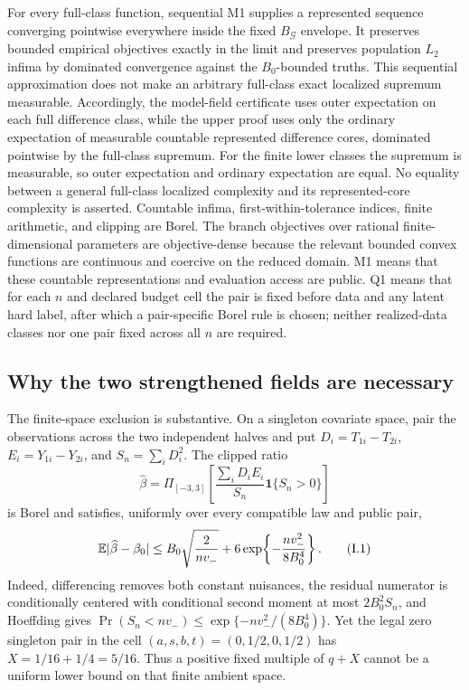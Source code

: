 For every full-class function, sequential M1 supplies a represented sequence
converging pointwise everywhere inside the fixed \(B_{\mathcal G}\) envelope.
It preserves bounded empirical objectives exactly in the limit and preserves
population \(L_2\) infima by dominated convergence against the
\(B_0\)-bounded truths.
This sequential approximation does not make an arbitrary full-class exact localized supremum measurable.  Accordingly, the model-field certificate
uses outer expectation on each full difference class, while the upper proof uses only the ordinary expectation of measurable countable represented
difference cores, dominated pointwise by the full-class supremum.  For the
finite lower classes the supremum is measurable, so outer expectation and
ordinary expectation are equal.  No equality between a general full-class
localized complexity and its represented-core complexity is asserted.
Countable infima, first-within-tolerance indices, finite arithmetic, and
clipping are Borel.  The branch objectives over rational finite-dimensional
parameters are objective-dense because the relevant bounded convex functions
are continuous and coercive on the reduced domain.  M1 means that these
countable representations and evaluation access are public.  Q1 means that
for each \(n\) and declared budget cell the pair is fixed before data and any
latent hard label, after which a pair-specific Borel rule is chosen; neither
realized-data classes nor one pair fixed across all \(n\) are required.

\subsection{Why the two strengthened fields are necessary}

The finite-space exclusion is substantive.  On a singleton covariate space,
pair the observations across the two independent halves and put
\(D_i=T_{1i}-T_{2i}\), \(E_i=Y_{1i}-Y_{2i}\), and
\(S_n=\sum_iD_i^2\).  The clipped ratio
\[
 \widehat\beta=\Pi_{[-3,3]}\left[
 \frac{\sum_iD_iE_i}{S_n}\mathbf 1\{S_n>0\}\right]
\]
is Borel and satisfies, uniformly over every compatible law and public pair,
\[
 \mathbb E|\widehat\beta-\beta_0|
 \le B_0\sqrt{\frac{2}{nv_-}}
 +6\exp\!\left\{-\frac{nv_-^2}{8B_0^4}\right\}.
 \tag{I.1}
\]
Indeed, differencing removes both constant nuisances, the residual numerator
is conditionally centered with conditional second moment at most
\(2B_0^2S_n\), and Hoeffding gives
\(\Pr(S_n<nv_-)\le\exp\{-nv_-^2/(8B_0^4)\}\).  Yet the legal zero singleton
pair in the cell \((a,s,b,t)=(0,1/2,0,1/2)\) has
\(X=1/16+1/4=5/16\).  Thus a positive fixed multiple of \(q+X\) cannot be a
uniform lower bound on that finite ambient space.

